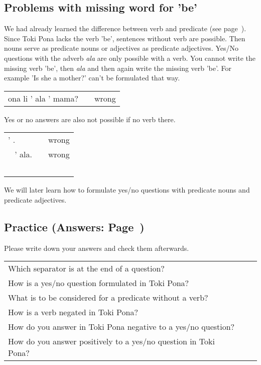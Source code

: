 % 
\subsection*{Problems with missing word for 'be'}

We had already learned the difference between verb and predicate (see page~\pageref{'predicate'}). 
Since Toki Pona lacks the verb 'be', sentences without verb are possible. 
Then nouns serve as predicate nouns or adjectives as predicate adjectives. 
Yes/No questions with the adverb \textit{ala} are only possible with a verb. 
You cannot write the missing verb 'be', then \textit{ala} and then again write the missing verb 'be'.
For example 'Is she a mother?' can't be formulated that way. 

\begin{supertabular}{p{5,5cm}|ll}
ona li ' ala ' mama? && wrong \\ %
\end{supertabular} 

Yes or no answers are also not possible if no verb there. 

\begin{supertabular}{p{5,5cm}|ll}
' . && wrong \\\ %
' ala. && wrong \\\ %
\end{supertabular} 

We will later learn how to formulate yes/no questions with predicate nouns and predicate adjectives.
%
\newpage
\subsection*{Practice (Answers: Page~\pageref{'negation_yes_no_questions'})}
%
Please write down your answers and check them afterwards. 

\begin{supertabular}{p{5,5cm}|ll}
Which separator is at the end of a question? &&  \\ %
How is a yes/no question formulated in Toki Pona? &&   \\ %
What is to be considered for a predicate without a verb? &&   \\ %
How is a verb negated in Toki Pona? &&  \\ %
How do you answer in Toki Pona negative to a yes/no question? &&  \\ %
How do you answer positively to a yes/no question in Toki Pona? &&  \\ %
\end{supertabular} 

